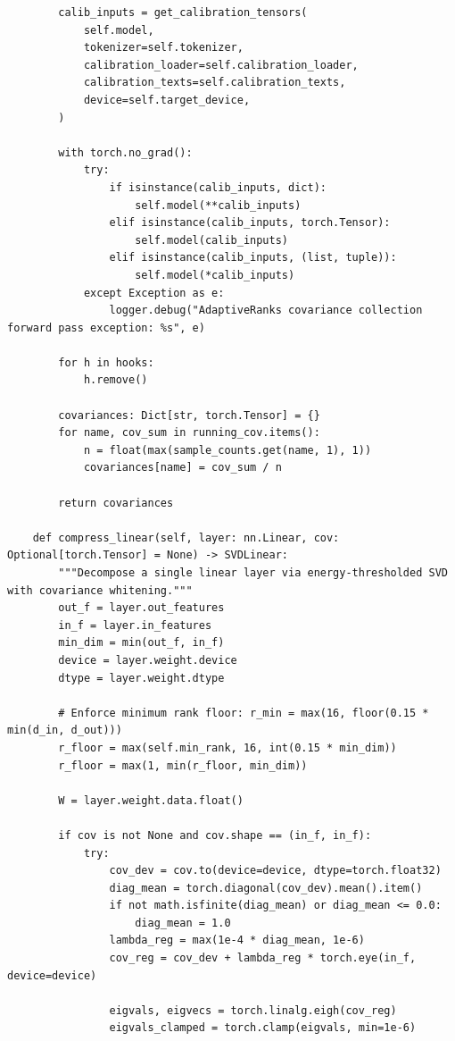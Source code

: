 \begin{lstlisting}
        calib_inputs = get_calibration_tensors(
            self.model,
            tokenizer=self.tokenizer,
            calibration_loader=self.calibration_loader,
            calibration_texts=self.calibration_texts,
            device=self.target_device,
        )

        with torch.no_grad():
            try:
                if isinstance(calib_inputs, dict):
                    self.model(**calib_inputs)
                elif isinstance(calib_inputs, torch.Tensor):
                    self.model(calib_inputs)
                elif isinstance(calib_inputs, (list, tuple)):
                    self.model(*calib_inputs)
            except Exception as e:
                logger.debug("AdaptiveRanks covariance collection forward pass exception: %s", e)

        for h in hooks:
            h.remove()

        covariances: Dict[str, torch.Tensor] = {}
        for name, cov_sum in running_cov.items():
            n = float(max(sample_counts.get(name, 1), 1))
            covariances[name] = cov_sum / n

        return covariances

    def compress_linear(self, layer: nn.Linear, cov: Optional[torch.Tensor] = None) -> SVDLinear:
        """Decompose a single linear layer via energy-thresholded SVD with covariance whitening."""
        out_f = layer.out_features
        in_f = layer.in_features
        min_dim = min(out_f, in_f)
        device = layer.weight.device
        dtype = layer.weight.dtype

        # Enforce minimum rank floor: r_min = max(16, floor(0.15 * min(d_in, d_out)))
        r_floor = max(self.min_rank, 16, int(0.15 * min_dim))
        r_floor = max(1, min(r_floor, min_dim))

        W = layer.weight.data.float()

        if cov is not None and cov.shape == (in_f, in_f):
            try:
                cov_dev = cov.to(device=device, dtype=torch.float32)
                diag_mean = torch.diagonal(cov_dev).mean().item()
                if not math.isfinite(diag_mean) or diag_mean <= 0.0:
                    diag_mean = 1.0
                lambda_reg = max(1e-4 * diag_mean, 1e-6)
                cov_reg = cov_dev + lambda_reg * torch.eye(in_f, device=device)

                eigvals, eigvecs = torch.linalg.eigh(cov_reg)
                eigvals_clamped = torch.clamp(eigvals, min=1e-6)


\end{lstlisting}
